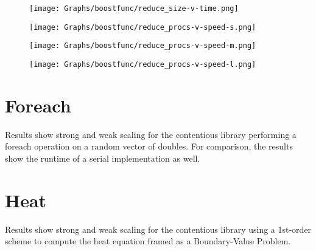 \begin{figure}[!h]
\centering
    \texttt{[image: Graphs/boostfunc/reduce\_size-v-time.png]}
\end{figure}
\begin{figure}[!h]
\centering
    \texttt{[image: Graphs/boostfunc/reduce\_procs-v-speed-s.png]}
\end{figure}
\begin{figure}[!h]
\centering
    \texttt{[image: Graphs/boostfunc/reduce\_procs-v-speed-m.png]}
\end{figure}
\begin{figure}[!h]
\centering
    \texttt{[image: Graphs/boostfunc/reduce\_procs-v-speed-l.png]}
\end{figure}

\section{Foreach}
Results show strong and weak scaling for the contentious library performing a
foreach operation on a random vector of doubles. For comparison, the results
show the runtime of a serial implementation as well.

\section{Heat}
Results show strong and weak scaling for the contentious library using a
1st-order scheme to compute the heat equation framed as a Boundary-Value
Problem.

\begin{comment}
With optimization turned on vec behaves a lot like seq. Without
optimization, vec is a lot slower. All these benchmarks use optimization flags,
so the results are almost identical between seq and veche "async"
implementation uses C++ threads with the async
\end{comment}
